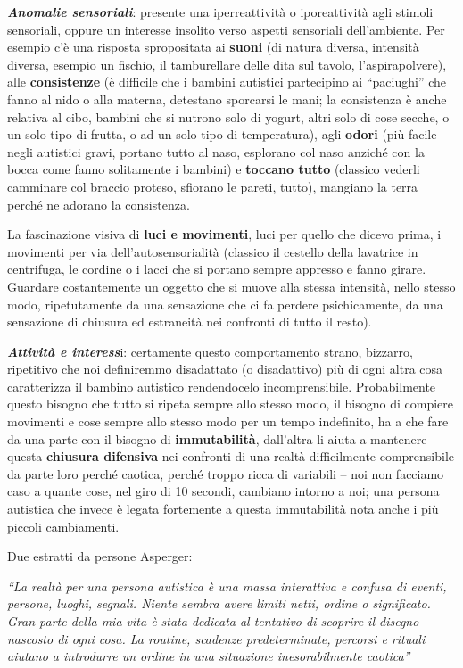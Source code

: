\documentclass[]{article}
\begin{document}
\emph{\textbf{Anomalie sensoriali}}: presente una iperreattività o
iporeattività agli stimoli sensoriali, oppure un interesse insolito
verso aspetti sensoriali dell'ambiente. Per esempio c'è una risposta
spropositata ai \textbf{suoni} (di natura diversa, intensità diversa,
esempio un fischio, il tamburellare delle dita sul tavolo,
l'aspirapolvere), alle \textbf{consistenze} (è difficile che i bambini
autistici partecipino ai ``paciughi'' che fanno al nido o alla materna,
detestano sporcarsi le mani; la consistenza è anche relativa al cibo,
bambini che si nutrono solo di yogurt, altri solo di cose secche, o un
solo tipo di frutta, o ad un solo tipo di temperatura), agli
\textbf{odori} (più facile negli autistici gravi, portano tutto al naso,
esplorano col naso anziché con la bocca come fanno solitamente i
bambini) e \textbf{toccano tutto} (classico vederli camminare col
braccio proteso, sfiorano le pareti, tutto), mangiano la terra perché ne
adorano la consistenza.

La fascinazione visiva di \textbf{luci e movimenti}, luci per quello che
dicevo prima, i movimenti per via dell'autosensorialità (classico il
cestello della lavatrice in centrifuga, le cordine o i lacci che si
portano sempre appresso e fanno girare. Guardare costantemente un
oggetto che si muove alla stessa intensità, nello stesso modo,
ripetutamente da una sensazione che ci fa perdere psichicamente, da una
sensazione di chiusura ed estraneità nei confronti di tutto il resto).

\emph{\textbf{Attività e interess}}i: certamente questo comportamento
strano, bizzarro, ripetitivo che noi definiremmo disadattato (o
disadattivo) più di ogni altra cosa caratterizza il bambino autistico
rendendocelo incomprensibile. Probabilmente questo bisogno che tutto si
ripeta sempre allo stesso modo, il bisogno di compiere movimenti e cose
sempre allo stesso modo per un tempo indefinito, ha a che fare da una
parte con il bisogno di \textbf{immutabilità}, dall'altra li aiuta a
mantenere questa \textbf{chiusura difensiva} nei confronti di una realtà
difficilmente comprensibile da parte loro perché caotica, perché troppo
ricca di variabili -- noi non facciamo caso a quante cose, nel giro di
10 secondi, cambiano intorno a noi; una persona autistica che invece è
legata fortemente a questa immutabilità nota anche i più piccoli
cambiamenti.

Due estratti da persone Asperger:

\emph{``La realtà per una persona autistica è una massa interattiva e
confusa di eventi, persone, luoghi, segnali. Niente sembra avere limiti
netti, ordine o significato. Gran parte della mia vita è stata dedicata
al tentativo di scoprire il disegno nascosto di ogni cosa. La routine,
scadenze predeterminate, percorsi e rituali aiutano a introdurre un
ordine in una situazione inesorabilmente caotica'' }
\end{document}
